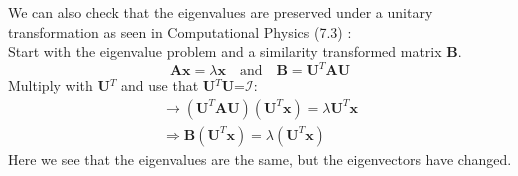 \documentclass[12pt,a4paper,english]{article}
\begin{document}
We can also check that the eigenvalues are preserved under a unitary transformation as seen in Computational Physics (7.3) \cite{lectures}:\\
Start with the eigenvalue problem and a similarity transformed matrix \textbf{B}. 
\begin{equation}
\label{eq:sim_transf}
\textbf{Ax}=\lambda\textbf{x}\quad \text{and}\quad \textbf{B}=\textbf{U}^T\textbf{A}\textbf{U}
\end{equation}
Multiply with \textbf{U}$^T$ and use that \textbf{U}$^T$\textbf{U}=$\mathcal{I}$:
\begin{align*}
\rightarrow (\textbf{U}^T\textbf{A}\textbf{U})(\textbf{U}^T\textbf{x})=\lambda\textbf{U}^T\textbf{x}\\
\Rightarrow \textbf{B}(\textbf{U}^T\textbf{x})=\lambda(\textbf{U}^T\textbf{x})
\end{align*}
Here we see that the eigenvalues are the same, but the eigenvectors have changed.
\end{document}
